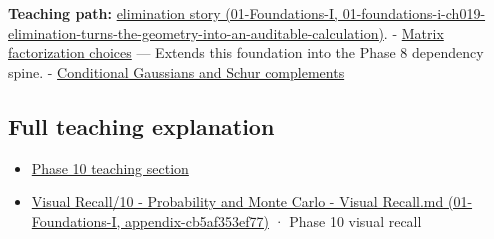 \textbf{Teaching path:} \href{../01-Foundations-I/main.pdf\#nameddest=01-foundations-i-ch019-elimination-turns-the-geometry-into-an-auditable-calculation}{elimination story (01-Foundations-I, 01-foundations-i-ch019-elimination-turns-the-geometry-into-an-auditable-calculation)}. - \hyperref[appendix-221a483bec2d]{Matrix factorization choices} --- Extends this foundation into the Phase 8 dependency spine. - \hyperref[appendix-f0437ea55a47]{Conditional Gaussians and Schur complements}

\subsection{Full teaching explanation}\label{appendix-f6e77f4a200f-full-teaching-explanation}

\begin{itemize}
\tightlist
\item
  \hyperref[02-foundations-ii-ch024-waiting-times-event-counts-and-covariance-geometry]{Phase 10 teaching section}
\item
  \href{../01-Foundations-I/main.pdf\#nameddest=appendix-cb5af353ef77}{Visual Recall/10 - Probability and Monte Carlo - Visual Recall.md (01-Foundations-I, appendix-cb5af353ef77)} · Phase 10 visual recall
\end{itemize}
